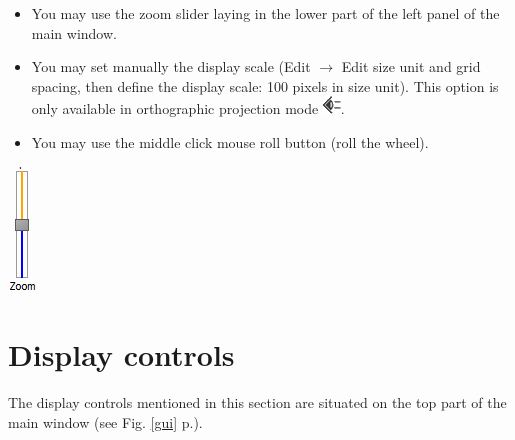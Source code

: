 \begin{minipage}{0.7\textwidth}
\begin{itemize}
\item You may use the zoom slider laying in the lower part of the left panel of the main window.
\item	You may set manually the display scale (Edit $\rightarrow$  Edit size unit and grid spacing, then define the display scale: 100 pixels in size unit). This option is only available in orthographic projection mode \includegraphics[scale=0.7]{images/06/camera/camera_ortho.png}.
\item	You may use the middle click mouse roll button (roll the wheel).
\end{itemize}
\end{minipage}    
\begin{minipage}{0.25\textwidth}\centering
  \includegraphics[scale=0.5]{images/06/camera/zoom_slider.png}


 \end{minipage}    


\section{Display controls}
The display controls mentioned in this section are situated on the top part of the main window (see Fig. \ref{gui} p.\pageref{gui}).


